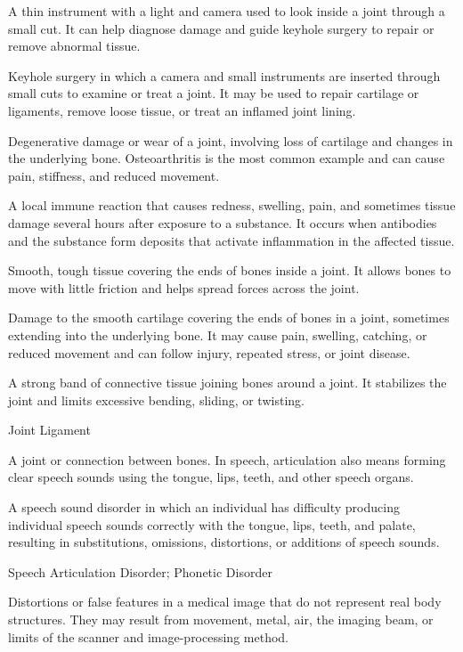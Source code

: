  A thin instrument with a light and camera used to look inside a joint through a small cut. It can help diagnose damage and guide keyhole surgery to repair or remove abnormal tissue.

 Keyhole surgery in which a camera and small instruments are inserted through small cuts to examine or treat a joint. It may be used to repair cartilage or ligaments, remove loose tissue, or treat an inflamed joint lining.

 Degenerative damage or wear of a joint, involving loss of cartilage and changes in the underlying bone. Osteoarthritis is the most common example and can cause pain, stiffness, and reduced movement.

 A local immune reaction that causes redness, swelling, pain, and sometimes tissue damage several hours after exposure to a substance. It occurs when antibodies and the substance form deposits that activate inflammation in the affected tissue.

 Smooth, tough tissue covering the ends of bones inside a joint. It allows bones to move with little friction and helps spread forces across the joint.

 Damage to the smooth cartilage covering the ends of bones in a joint, sometimes extending into the underlying bone. It may cause pain, swelling, catching, or reduced movement and can follow injury, repeated stress, or joint disease.

 A strong band of connective tissue joining bones around a joint. It stabilizes the joint and limits excessive bending, sliding, or twisting.

\synonyms
Joint Ligament

 A joint or connection between bones. In speech, articulation also means forming clear speech sounds using the tongue, lips, teeth, and other speech organs.

 A speech sound disorder in which an individual has difficulty producing individual speech sounds correctly with the tongue, lips, teeth, and palate, resulting in substitutions, omissions, distortions, or additions of speech sounds.

\synonyms
Speech Articulation Disorder; Phonetic Disorder

 Distortions or false features in a medical image that do not represent real body structures. They may result from movement, metal, air, the imaging beam, or limits of the scanner and image-processing method.

